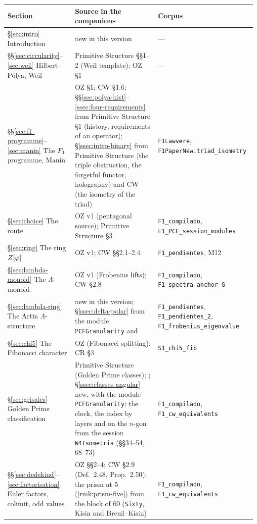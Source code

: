\begin{longtable}{p{}p{}p{}}
\toprule Section & Source in the companions & Corpus\\\midrule\endhead
\S\ref{sec:intro} Introduction & new in this version & ---\\
\S\S\ref{sec:circularity}--\ref{sec:weil} Hilbert--P\'olya, Weil & Primitive Structure \S\S1--2 (Weil template); OZ \S1 & ---\\
\S\S\ref{sec:f1-programme}--\ref{sec:manin} The $F_1$ programme, Manin & OZ \S1; CW \S1.6; \S\S\ref{sec:polya-hist}--\ref{ssec:four-requirements} from Primitive Structure \S1 (history, requirements of an operator); \S\ref{ssec:intro-binary} from Primitive Structure (the triple obstruction, the forgetful functor, holography) and CW (the isometry of the triad) & \texttt{F1Lawvere}, \texttt{F1PaperNew.triad\_isometry}\\
\S\ref{sec:choice} The route & OZ v1 (pentagonal source); Primitive Structure \S3 & \texttt{F1\_compilado}, \texttt{F1\_PCF\_session\_modules}\\
\S\ref{sec:ring} The ring $Z[\varphi]$ & OZ v1; CW \S\S2.1--2.4 & \texttt{F1\_pendientes}, M12\\
\S\ref{sec:lambda-monoid} The $\Lambda$-monoid & OZ v1 (Frobenius lifts); CW \S2.8 & \texttt{F1\_compilado}, \texttt{F1\_spectra\_anchor\_G}\\
\S\ref{sec:lambda-ring} The Artin $\Lambda$-structure & new in this version; \S\ref{ssec:delta-polar} from the module \texttt{PCFGranularity} and \cite{bhattscholze22} & \texttt{F1\_pendientes}, \texttt{F1\_pendientes\_2}, \texttt{F1\_frobenius\_eigenvalue}\\
\S\ref{sec:chi5} The Fibonacci character & OZ (Fibonacci splitting); CR \S3 & \texttt{S1\_chi5\_fib}\\
\S\ref{sec:grisales} Golden Prime classification & Primitive Structure (Golden Prime classes); \cite{grisales25}; \S\ref{ssec:classes-angular} new, with the module \texttt{PCFGranularity}; the clock, the index by layers and on the $n$-gon from the session \texttt{W4Isometria} (\S\S34--54, 68--73) & \texttt{F1\_compilado}, \texttt{F1\_cw\_equivalents}\\
\S\S\ref{sec:dedekind}--\ref{sec:factorisation} Euler factors, colimit, odd values & OZ \S\S2--4; CW \S2.9 (Def.~2.48, Prop.~2.50); the prism at $5$ (\cref{rmk:prism-five}) from the block of $60$ (\texttt{Sixty}, Kisin and Breuil--Kisin) & \texttt{F1\_compilado}, \texttt{F1\_cw\_equivalents}\\

\end{longtable}
